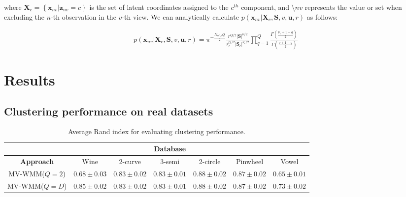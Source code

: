 \documentclass[]{article}
\newcommand{\Scluster}{\mathbf{S}}
\newcommand{\setX}{\mathbf{X}}
\newcommand{\obspv}{\mathbf{x}_{nv}}
\begin{document}
where $\setX_c = \left\{\obspv|\mathbf{z}_{nv}=c\right\}$ is the set of latent coordinates
assigned to the $c^{th}$ component, and $\setminus{nv}$ represents
the value or set when excluding the $n$-th observation in the $v$-th view. We can analytically calculate $p\left(\obspv|\setX_c, \Scluster,v,\mathbf{u},r\right)$  as follows:

\begin{align*}
p\left(\obspv|\setX_c, \Scluster,v,\mathbf{u},r\right) = \pi^{-\frac{N_{vc\setminus n}Q}{2}}\frac{r^{Q/2}|\Scluster|^{\nu/2}}{r_c^{Q/2}|\Scluster_c|^{\nu_c/2}}\prod_{q=1}^{Q}\frac{\Gamma\left(\frac{\nu_c + 1 -q}{2}\right)}{\Gamma\left(\frac{\nu + 1 -q}{2}\right)}
\end{align*}


\section{Results}

\subsection{Clustering performance on real datasets}

\begin{table}[ht!]
	\centering
	\caption{Average Rand index for evaluating clustering performance.}
	\label{tab:comparison1}
	\begin{tabular}{c c c c c c c}
		\cline{2-7}
		& \multicolumn{5}{c}{\textbf{Database}}\\
		\hline
		\textbf{Approach} &  	Wine & 2-curve & 3-semi & 2-circle & Pinwheel& Vowel\\
		\hline\hline
		\hline
		MV-WMM($Q=2$) & $0.68\pm0.03$  &$0.83\pm0.02$ &$0.83\pm0.01$&$0.88\pm0.02$&$0.87\pm0.02$ & $0.65\pm0.01$\\
		MV-WMM($Q=D$) & $0.85\pm 0.02$ &$0.83\pm0.02$&$0.83\pm0.01$&$0.88\pm0.02$&$0.87\pm0.02$&$0.73\pm0.02$\\
		\hline

	\end{tabular}
\end{table}
\end{document}

